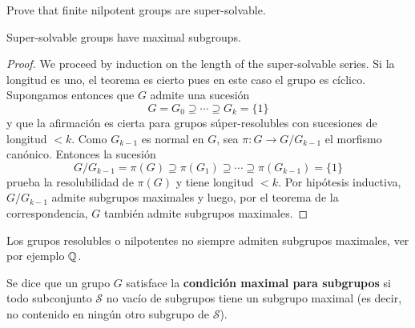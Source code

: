 
\begin{exercise}
\label{xca:nilpotent=>supersolvable}
Prove that finite nilpotent groups are super-solvable.
\end{exercise}


\begin{theorem}
Super-solvable groups have maximal subgroups. 	
\end{theorem}

\begin{proof}
We proceed by induction on the length of the super-solvable series. 
Si la longitud es uno, el teorema es cierto pues en
	este caso el grupo es cíclico. Supongamos entonces que $G$ admite una
	sucesión
	\[
		G=G_0\supseteq\cdots\supseteq G_k=\{1\}
	\]
	y que la afirmación es cierta para grupos súper-resolubles con sucesiones 
	de longitud $<k$. Como $G_{k-1}$ es normal en $G$, sea $\pi\colon G\to
	G/G_{k-1}$ el morfismo canónico. Entonces la sucesión
	\[
		G/G_{k-1}=\pi(G)\supseteq \pi(G_1)\supseteq\cdots\supseteq\pi(G_{k-1})=\{1\}
	\]
	prueba la resolubilidad de $\pi(G)$ y tiene longitud $<k$. Por hipótesis
	inductiva, $G/G_{k-1}$ admite subgrupos maximales y luego, por el teorema
	de la correspondencia, $G$ también admite subgrupos maximales.
\end{proof}

Los grupos resolubles o nilpotentes no siempre admiten
subgrupos maximales, ver por ejemplo $\mathbb{Q}$.

\begin{definition}
	Se dice que un grupo $G$ satisface la \textbf{condición maximal para
	subgrupos} si 
	todo subconjunto $\mathcal{S}$ no vacío de subgrupos tiene un subgrupo
	maximal (es decir, no contenido en ningún otro subgrupo de $\mathcal{S}$). 
\end{definition}

